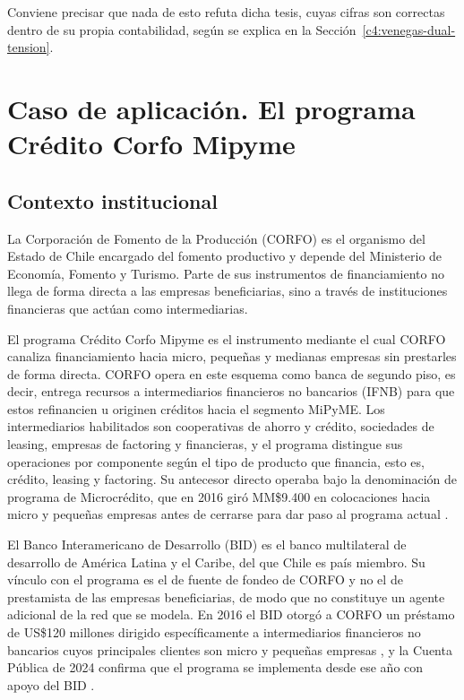 Conviene precisar que nada de esto refuta dicha tesis, cuyas cifras son correctas
dentro de su propia contabilidad, según se explica en la
Sección~\ref{c4:venegas-dual-tension}.

\section{Caso de aplicación. El programa Crédito Corfo Mipyme}
\label{c3:caso}

\subsection{Contexto institucional}
\label{c3:contexto}

La Corporación de Fomento de la Producción (CORFO) es el organismo del Estado de Chile encargado del fomento productivo y depende del Ministerio de Economía, Fomento y Turismo. Parte de sus instrumentos de financiamiento no llega de forma directa a las empresas beneficiarias, sino a través de instituciones financieras que actúan como intermediarias.

El programa Crédito Corfo Mipyme es el instrumento mediante el cual CORFO canaliza financiamiento hacia micro, pequeñas y medianas empresas sin prestarles de forma directa. CORFO opera en este esquema como banca de segundo piso, es decir, entrega recursos a intermediarios financieros no bancarios (IFNB) para que estos refinancien u originen créditos hacia el segmento MiPyME. Los intermediarios habilitados son cooperativas de ahorro y crédito, sociedades de leasing, empresas de factoring y financieras, y el programa distingue sus operaciones por componente según el tipo de producto que financia, esto es, crédito, leasing y factoring. Su antecesor directo operaba bajo la denominación de programa de Microcrédito, que en 2016 giró MM\$9.400 en colocaciones hacia micro y pequeñas empresas antes de cerrarse para dar paso al programa actual \cite{corfo_cuenta_publica_2016}.

El Banco Interamericano de Desarrollo (BID) es el banco multilateral de desarrollo de América Latina y el Caribe, del que Chile es país miembro. Su vínculo con el programa es el de fuente de fondeo de CORFO y no el de prestamista de las empresas beneficiarias, de modo que no constituye un agente adicional de la red que se modela. En 2016 el BID otorgó a CORFO un préstamo de US\$120 millones dirigido específicamente a intermediarios financieros no bancarios cuyos principales clientes son micro y pequeñas empresas \cite{corfo_cuenta_publica_2016}, y la Cuenta Pública de 2024 confirma que el programa se implementa desde ese año con apoyo del BID \cite{corfo_cuenta_publica_2024}.

